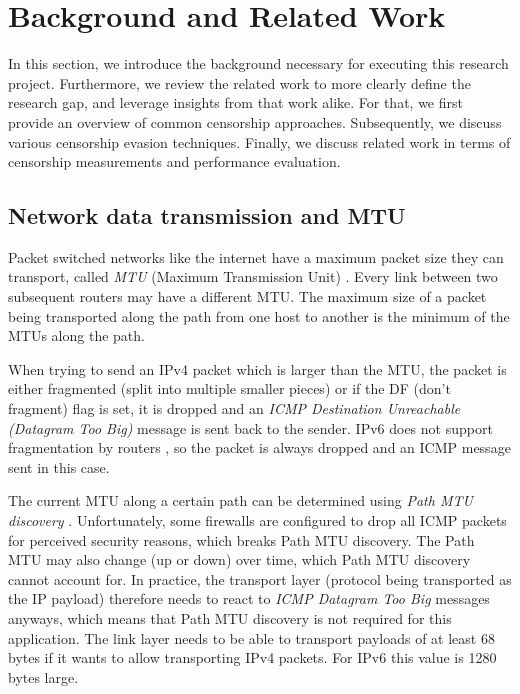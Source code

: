 
\chapter{Background and Related Work}
\label{chap:background}


In this section, we introduce the background necessary for executing this research project.
Furthermore, we review the related work to more clearly define the research gap, and leverage insights from that work alike.
For that, we first provide an overview of common censorship approaches.
Subsequently, we discuss various censorship evasion techniques.
Finally, we discuss related work in terms of censorship measurements and performance evaluation.

\section{Network data transmission and MTU}
Packet switched networks like the internet have a maximum packet size they can transport, called \textit{MTU} (Maximum Transmission Unit) \cite{wiki:Maximum_transmission_unit}.
Every link between two subsequent routers may have a different MTU.
The maximum size of a packet being transported along the path from one host to another is the minimum of the MTUs along the path.

When trying to send an IPv4 packet which is larger than the MTU, the packet is either fragmented (split into multiple smaller pieces) or if the DF (don't fragment) flag is set, it is dropped and an \textit{ICMP Destination Unreachable (Datagram Too Big)} message is sent back to the sender.
IPv6 does not support fragmentation by routers \cite{RFC2460}, so the packet is always dropped and an ICMP message sent in this case.

The current MTU along a certain path can be determined using \textit{Path MTU discovery} \cite{wiki:Path_MTU_Discovery}.
Unfortunately, some firewalls are configured to drop all ICMP packets for perceived security reasons, which breaks Path MTU discovery.
The Path MTU may also change (up or down) over time, which Path MTU discovery cannot account for.
In practice, the transport layer (protocol being transported as the IP payload) therefore needs to react to \textit{ICMP Datagram Too Big} messages anyways, which means that Path MTU discovery is not required for this application.
The link layer needs to be able to transport payloads of at least 68 bytes if it wants to allow transporting IPv4 packets.
For IPv6 this value is 1280 bytes large.

